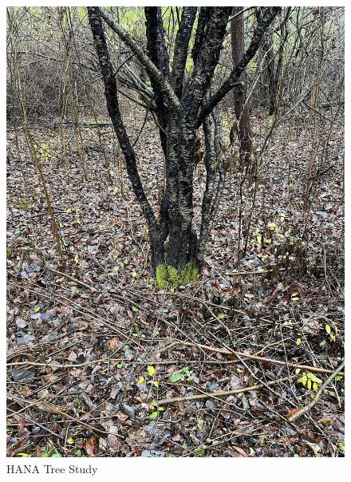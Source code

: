 \documentclass{article}
\begin{document}
\begin{figure}[h!]
\centering
\includegraphics[scale=.1]{Research/HANA/NOV2024/IMG_9845.JPG}
\caption{HANA Tree Study}
\label{fig:HANA}
\end{figure}
\end{document}
